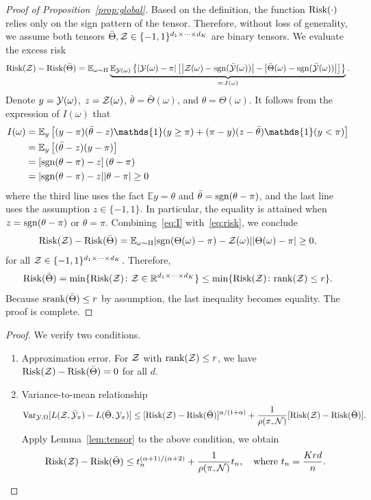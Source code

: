 \documentclass{article}
\theoremstyle{plain}
\theoremstyle{definition}
\newcommand*{\KeepStyleUnderBrace}[1]{%
  \mathop{%
    \mathchoice
    {\underbrace{\displaystyle#1}}%
    {\underbrace{\textstyle#1}}%
    {\underbrace{\scriptstyle#1}}%
    {\underbrace{\scriptscriptstyle#1}}%
  }\limits
}
\def\sign{\textup{sgn}}
\def\srank{\textup{srank}}
\def\rank{\textup{rank}}
\def\risk{\textup{Risk}}
\begin{document}
\begin{proof}[Proof of Proposition~\ref{prop:global}]
Based on the definition, the function $\risk(\cdot)$ relies only on the sign pattern of the tensor. Therefore, without loss of generality, we assume both tensors $\bar \Theta, \mathcal{Z} \in\{-1,1\}^{d_1\times \cdots \times d_K}$ are binary tensors. 
We evaluate the excess risk 
\begin{equation}\label{eq:risk}
\risk(\tZ)- \risk(\bar \Theta) = \mathbb{E}_{\omega\sim \Pi}\KeepStyleUnderBrace{\mathbb{E}_{\tY(\omega)}\left\{|\tY(\omega)-\pi|\left[\left|\tZ(\omega)-\sign(\bar \tY(\omega)) \right|-\left|\bar\Theta(\omega)-\sign(\bar \tY(\omega))\right|\right]\right\}}_{=:I(\omega)}.
\end{equation}
Denote $y=\mathcal{Y}(\omega)$, $z=\mathcal{Z}(\omega)$, $\bar \theta=\bar\Theta(\omega)$, and $\theta=\Theta(\omega)$. It follows from the expression of $I(\omega)$ that
\begin{align}\label{eq:I}
I(\omega)&= \mathbb{E}_{y}\left[ (y-\pi)(\bar \theta-z)\mathds{1}(y\geq \pi)+(\pi-y)(z-\bar \theta)\mathds{1}(y< \pi)\right]\\
&= \mathbb{E}_{y}\left[(\bar \theta-z) (y-\pi)\right]\\
&=  \left[\sign(\theta-\pi)-z\right]\left(\theta-\pi\right)\\
&= |\sign(\theta-\pi)-z||\theta-\pi|\geq 0
\end{align}
where the third line uses the fact $\mathbb{E}y=\theta$ and $\bar \theta=\sign(\theta-\pi)$, and the last line uses the assumption $z \in\{-1,1\}$. In particular, the equality is attained when $z=\sign(\theta-\pi)$ or $\theta=\pi$. Combining~\eqref{eq:I} with~\eqref{eq:risk}, we conclude 
\[
\risk(\tZ)- \risk(\bar \Theta) = \mathbb{E}_{\omega\sim \Pi} |\sign(\Theta(\omega)-\pi)-\tZ(\omega)||\Theta(\omega)-\pi|\geq 0,
\]
for all $\mathcal{Z}\in\{-1,1\}^{d_1\times \cdots \times d_K}$. Therefore,
\[
\risk(\bar \Theta)=\min\{\risk(\tZ)\colon \tZ\in \mathbb{R}^{d_1\times \cdots \times d_K}\} \leq \min\{\risk(\tZ)\colon \rank(\tZ)\leq r\}.
\]
Because $\srank(\bar \Theta)\leq r$ by assumption, the last inequality becomes equality. The proof is complete. 
\end{proof}


\begin{proof}
We verify two conditions. 
\begin{enumerate}
\item Approximation error. For $\mathcal{Z}$ with $\text{rank}(\mathcal{Z})\leq r$, we have $\textup{Risk}(\mathcal{Z})-\textup{Risk}(\bar \Theta)=0$ for all $d$.  
\item Variance-to-mean relationship
\[
\text{Var}_{\mathcal{Y}, \Omega}[L(\mathcal{Z},\bar {\mathcal{Y}}_\pi)-L(\bar \Theta, \mathcal{Y}_\pi)]\leq [\textup{Risk}(\mathcal{Z})-\textup{Risk}(\bar \Theta)]^{\alpha/(1+\alpha)}+{1\over \rho(\pi, \mathcal{N})}[\textup{Risk}(\mathcal{Z})-\textup{Risk}(\bar \Theta)].
\]
Apply Lemma~\ref{lem:tensor} to the above condition, we obtain
\[
\textup{Risk}(\mathcal{Z})-\textup{Risk}(\bar \Theta)\leq t_n^{(\alpha+1)/(\alpha+2)}+{1\over \rho(\pi, \mathcal{N})}t_n, \quad \text{where }t_n={Krd\over n}.
\]
\end{enumerate}
\end{proof}
\end{document}
